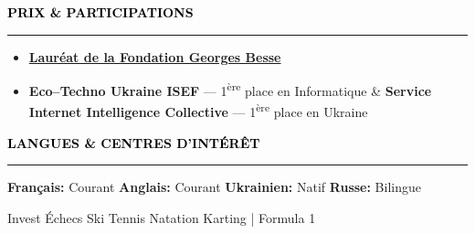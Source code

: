 \documentclass[10pt,english,french]{article}
\newcommand{\chessIcon}[1][black]{\textcolor{#1}{\faChess}}
\newcommand{\skiIcon}[1][black]{\textcolor{#1}{\faSkiing}}
\newcommand{\cryptoIcon}[1][black]{\textcolor{#1}{\faBitcoin}}
\newcommand{\swimmingIcon}[1][black]{\textcolor{#1}{\faSwimmer}}
\newcommand{\mountainsIcon}[1][black]{\textcolor{#1}{\faMountain}}
\newcommand{\awardIcon}[1][black]{\textcolor{#1}{\faTrophy}}
\newcommand{\speechBubbleIcon}[1][black]{\textcolor{#1}{\faComment}}
\newcommand{\tradingIcon}[1][black]{\textcolor{#1}{\faChartBar}}
\newcommand{\tennisIcon}[1][black]{\textcolor{#1}{\faBaseballBall}}
\newcommand{\flagIcon}[1][black]{\textcolor{#1}{\faFlagCheckered}}
\newlength{\mpwidth}
\newcommand{\cvsection}[1]{
    \vspace{4pt}
    \textbf{\fontsize{9pt}{10pt}\selectfont \textcolor{black}{#1}}
    \vspace{6pt}
    \hrule
    \vspace{6pt}
}
\newcommand{\cvtextnotab}[1]{
    \parbox{1\mpwidth}{#1}
}
\begin{document}
\vspace{-3pt}
\cvsection{\awardIcon[black]\hspace{4pt}PRIX \& PARTICIPATIONS}

\vspace{-6pt}
\begin{itemize}[leftmargin=0.35cm, label=\textbullet, itemsep=0.15em]
    \item \textbf{\href{https://www.fondationbesse.com/}{Lauréat de la Fondation Georges Besse}}
    \item \textbf{Eco\hspace{3pt}--\hspace{3pt}Techno Ukraine ISEF} --- 1\textsuperscript{ère} place en Informatique \& \textbf{Service Internet Intelligence Collective} --- 1\textsuperscript{ère} place en Ukraine
\end{itemize}

\vspace{-3pt}
\cvsection{\speechBubbleIcon[black]\hspace{4pt}LANGUES \& CENTRES D'INTÉRÊT}

\vspace{-3pt}
\cvtextnotab{\textbf{Français\!:} Courant \hspace{12pt} \textbf{Anglais\!:} Courant \hspace{12pt} \textbf{Ukrainien\!:} Natif \hspace{20pt} \textbf{Russe\!:} Bilingue}

\vspace{-8pt}
\cvtextnotab{
    \tradingIcon[black]\hspace{2pt}Invest \hspace{12pt}
    \chessIcon[black]\hspace{2pt}Échecs \hspace{12pt}
    \skiIcon[black]\hspace{2pt}Ski \hspace{12pt}
    \tennisIcon[black]\hspace{2pt}Tennis \hspace{12pt}
    \swimmingIcon[black]\hspace{2pt}Natation \hspace{12pt}
    \flagIcon[black]\hspace{2pt}Karting | Formula 1
}
\end{document}

